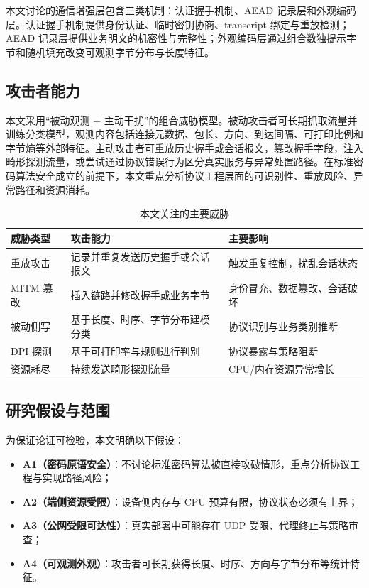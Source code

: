 本文讨论的通信增强层包含三类机制：认证握手机制、AEAD 记录层和外观编码层。认证握手机制提供身份认证、临时密钥协商、transcript 绑定与重放检测；AEAD 记录层提供业务明文的机密性与完整性；外观编码层通过组合数独提示字节和随机填充改变可观测字节分布与长度特征。

\subsection{攻击者能力}
本文采用“被动观测 + 主动干扰”的组合威胁模型。被动攻击者可长期抓取流量并训练分类模型，观测内容包括连接元数据、包长、方向、到达间隔、可打印比例和字节熵等外部特征。主动攻击者可重放历史握手或会话报文，篡改握手字段，注入畸形探测流量，或尝试通过协议错误行为区分真实服务与异常处置路径。在标准密码算法安全成立的前提下，本文重点分析协议工程层面的可识别性、重放风险、异常路径和资源消耗。

\begin{table}[H]
\centering
\small
\caption{本文关注的主要威胁}
\label{tab:c2-threat-model}
\begin{tabular}{p{3.1cm}p{5.3cm}p{5.0cm}}
\toprule
威胁类型 & 攻击能力 & 主要影响 \\
\midrule
重放攻击 & 记录并重复发送历史握手或会话报文 & 触发重复控制，扰乱会话状态 \\
MITM 篡改 & 插入链路并修改握手或业务字节 & 身份冒充、数据篡改、会话破坏 \\
被动侧写 & 基于长度、时序、字节分布建模分类 & 协议识别与业务类别推断 \\
DPI 探测 & 基于可打印率与规则进行判别 & 协议暴露与策略阻断 \\
资源耗尽 & 持续发送畸形探测流量 & CPU/内存资源异常增长 \\
\bottomrule
\end{tabular}
\end{table}

\subsection{研究假设与范围}
为保证论证可检验，本文明确以下假设：
\begin{itemize}
  \item \textbf{A1（密码原语安全）}：不讨论标准密码算法被直接攻破情形，重点分析协议工程与实现路径风险；
  \item \textbf{A2（端侧资源受限）}：设备侧内存与 CPU 预算有限，协议状态必须有上界；
  \item \textbf{A3（公网受限可达性）}：真实部署中可能存在 UDP 受限、代理终止与策略审查\cite{rfc8085,rfc4787,nedergaard2023coapsecure}；
  \item \textbf{A4（可观测外观）}：攻击者可长期获得长度、时序、方向与字节分布等统计特征。
\end{itemize}

